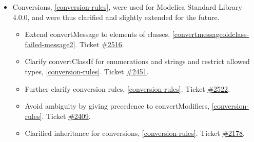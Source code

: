 \begin{itemize}
\item Conversions, \cref{conversion-rules}, were used for Modelica Standard Library 4.0.0, and were thus clarified and slightly extended for the future.
\begin{itemize}
\item Extend convertMessage to elements of classes, \cref{convertmessageoldclass-failed-message2}.
Ticket \href{https://github.com/modelica/ModelicaSpecification/issues/2516}{\#2516}.
\item Clarify convertClassIf for enumerations and strings and restrict allowed types, \cref{conversion-rules}.
Ticket \href{https://github.com/modelica/ModelicaSpecification/issues/2451}{\#2451}.
\item Further clarify conversion rules, \cref{conversion-rules}.
Ticket \href{https://github.com/modelica/ModelicaSpecification/pull/2522}{\#2522}.
\item Avoid ambiguity by giving precedence to convertModifiers, \cref{conversion-rules}.
Ticket \href{https://github.com/modelica/ModelicaSpecification/pull/2409}{\#2409}.
\item Clarified inheritance for conversions, \cref{conversion-rules}.
Ticket \href{https://github.com/modelica/ModelicaSpecification/issues/2178}{\#2178}.
\end{itemize}


\end{itemize}
